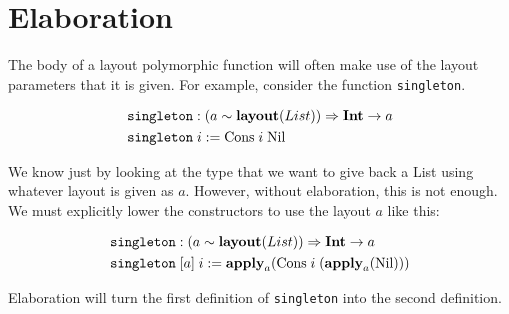 \section{Elaboration}

The body of a layout polymorphic \Pika{} function will often make use of the 
layout parameters that it is given. For example, consider the function \texttt{singleton}.

\begin{align*}
  &\texttt{singleton} : (a \sim \textbf{layout}(List)) \Rightarrow \textbf{Int} \rightarrow a\\
  &\texttt{singleton}\; i := \textrm{Cons}\; i\; \textrm{Nil}
\end{align*}

\noindent
We know just by looking at the type that we want to give back a \textrm{List} using
whatever layout is given as $a$. However, without elaboration, this is not enough. We must
explicitly lower the constructors to use the layout $a$ like this:

\begin{align*}
  &\texttt{singleton} : (a \sim \textbf{layout}(List)) \Rightarrow \textbf{Int} \rightarrow a\\
  &\texttt{singleton}\; [a]\; i := \textbf{apply}_a(\textrm{Cons}\; i\; (\textbf{apply}_a(\textrm{Nil})))
\end{align*}

\noindent
Elaboration will turn the first definition of \texttt{singleton} into the second definition.

